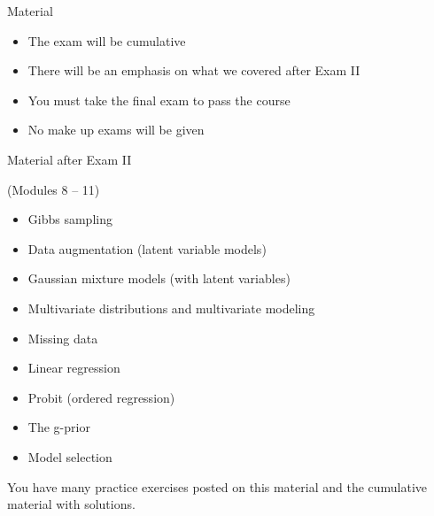 \documentclass[ignorenonframetext,]{beamer}
\providecommand{\tightlist}{%
  \setlength{\itemsep}{0pt}\setlength{\parskip}{0pt}}
\begin{document}
\begin{frame}{Material}

\begin{itemize}
\tightlist
\item
  The exam will be cumulative
\item
  There will be an emphasis on what we covered after Exam II
\item
  You must take the final exam to pass the course
\item
  No make up exams will be given
\end{itemize}

\end{frame}

\begin{frame}{Material after Exam II}

(Modules 8 -- 11)

\begin{itemize}
\tightlist
\item
  Gibbs sampling
\item
  Data augmentation (latent variable models)
\item
  Gaussian mixture models (with latent variables)
\item
  Multivariate distributions and multivariate modeling
\item
  Missing data
\item
  Linear regression
\item
  Probit (ordered regression)
\item
  The g-prior
\item
  Model selection
\end{itemize}

You have many practice exercises posted on this material and the
cumulative material with solutions.

\end{frame}
\end{document}

